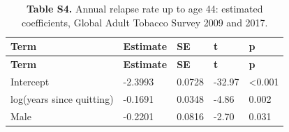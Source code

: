 \footnotesize
\begin{longtable}{lllll}
\caption{\textbf{Table S4.} Annual relapse rate up to age 44: estimated coefficients, Global Adult Tobacco Survey 2009 and 2017.}\\
\toprule
\textbf{Term} & \textbf{Estimate} & \textbf{SE} & \textbf{t} & \textbf{p} \\
\midrule
\endfirsthead
\toprule
\textbf{Term} & \textbf{Estimate} & \textbf{SE} & \textbf{t} & \textbf{p} \\
\midrule
\endhead
\bottomrule
\endfoot
Intercept & -2.3993 & 0.0728 & -32.97 & <0.001 \\
log(years since quitting) & -0.1691 & 0.0348 & -4.86 & 0.002 \\
Male & -0.2201 & 0.0816 & -2.70 & 0.031 \\
\end{longtable}
\normalsize
